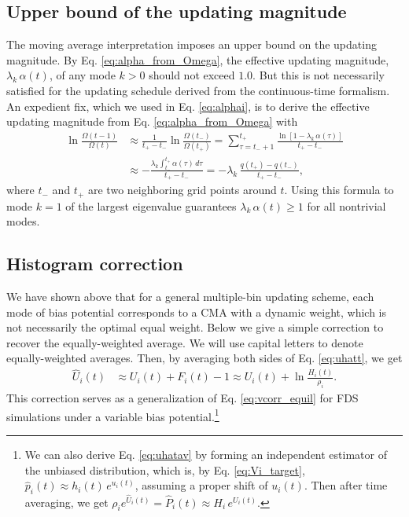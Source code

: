 \documentclass[reprint, superscriptaddress, floatfix]{revtex4-1}
\begin{document}
\subsection{\label{sec:ave_ub}
Upper bound of the updating magnitude}

The moving average interpretation imposes
an upper bound on the updating magnitude.
%
By Eq. \eqref{eq:alpha_from_Omega},
the effective updating magnitude, $\lambda_k \, \alpha(t)$,
of any mode $k > 0$
should not exceed $1.0$.
But this is not necessarily satisfied
for the updating schedule
derived from the continuous-time formalism.
%
An expedient fix,
which we used in Eq. \eqref{eq:alphai},
is to derive the effective updating magnitude
from Eq. \eqref{eq:alpha_from_Omega}
with
\begin{align*}
  \ln \frac{ \Omega(t-1) } { \Omega(t) }
  &\approx
  \frac{1}{t_+ - t_-} \ln \frac{ \Omega(t_-) } { \Omega(t_+) }
  =
  \!\!\sum_{\tau=t_- + 1}^{t_+}
  \frac{ \ln[1- \lambda_k \, \alpha(\tau)] } { t_+ - t_- }
  \\
  &\approx
  -\frac{ \lambda_k \int_{t_-}^{t_+} \alpha(\tau) \, d\tau}{t_+ - t_-}
  =
  -\lambda_k \, \frac{q(t_+) - q(t_-)}{t_+ - t_-}
  ,
\end{align*}
where $t_-$ and $t_+$ are two neighboring grid points
around $t$.
%
Using this formula to mode $k = 1$
of the largest eigenvalue
guarantees $\lambda_k \, \alpha(t) \ge 1$
for all nontrivial modes.



\subsection{Histogram correction}



We have shown above that
for a general multiple-bin updating scheme,
each mode of bias potential
corresponds to a CMA with a dynamic weight,
which is not necessarily the optimal equal weight.
%
Below we give a simple correction
to recover the equally-weighted average.
%
We will use capital letters to denote equally-weighted averages.
%
Then, by averaging both sides of Eq. \eqref{eq:uhatt}, we get
\begin{align}
  \hat U_i(t)
  &\approx
  U_i (t)
  + F_i(t) - 1
  \approx
  U_i(t)
  + \ln \frac{ H_i(t) } { \rho_i }
  .
  \label{eq:uhatav}
\end{align}
%
This correction serves as
a generalization of Eq. \eqref{eq:vcorr_equil}
for FDS simulations under
a variable bias potential.\footnote{We can also
  derive Eq. \eqref{eq:uhatav}
  by forming an independent estimator
  of the unbiased distribution\cite{marsili2006},
  which is, by Eq. \eqref{eq:Vi_target},
  $\hat p_i(t) \approx h_i(t) \, e^{ u_i(t) }$,
  assuming a proper shift of $u_i(t)$.
  Then after time averaging, we get
  $\rho_i e^{\hat U_i(t)} = \hat P_i(t) \approx H_i \, e^{ U_i(t) }$.}
\end{document}
